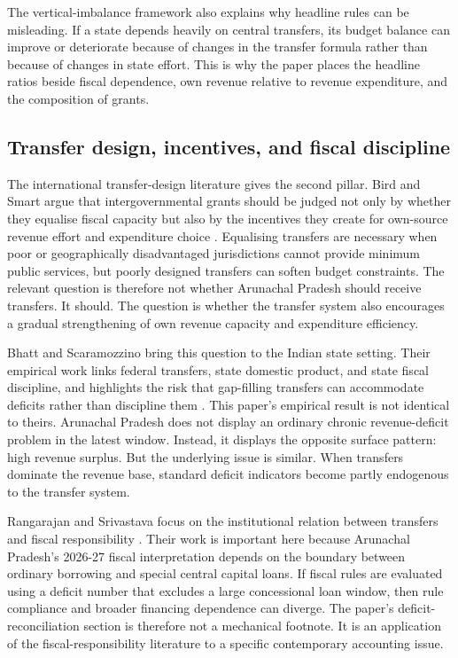 \documentclass[11pt,a4paper]{article}
\begin{document}
The vertical-imbalance framework also explains why headline rules can be misleading. If a state depends heavily on central transfers, its budget balance can improve or deteriorate because of changes in the transfer formula rather than because of changes in state effort. This is why the paper places the headline ratios beside fiscal dependence, own revenue relative to revenue expenditure, and the composition of grants.

\subsection{Transfer design, incentives, and fiscal discipline}

The international transfer-design literature gives the second pillar. Bird and Smart argue that intergovernmental grants should be judged not only by whether they equalise fiscal capacity but also by the incentives they create for own-source revenue effort and expenditure choice \cite{bird_smart_2002}. Equalising transfers are necessary when poor or geographically disadvantaged jurisdictions cannot provide minimum public services, but poorly designed transfers can soften budget constraints. The relevant question is therefore not whether Arunachal Pradesh should receive transfers. It should. The question is whether the transfer system also encourages a gradual strengthening of own revenue capacity and expenditure efficiency.

Bhatt and Scaramozzino bring this question to the Indian state setting. Their empirical work links federal transfers, state domestic product, and state fiscal discipline, and highlights the risk that gap-filling transfers can accommodate deficits rather than discipline them \cite{bhatt_scaramozzino_2015}. This paper's empirical result is not identical to theirs. Arunachal Pradesh does not display an ordinary chronic revenue-deficit problem in the latest window. Instead, it displays the opposite surface pattern: high revenue surplus. But the underlying issue is similar. When transfers dominate the revenue base, standard deficit indicators become partly endogenous to the transfer system.

Rangarajan and Srivastava focus on the institutional relation between transfers and fiscal responsibility \cite{rangarajan_srivastava_2011}. Their work is important here because Arunachal Pradesh's 2026-27 fiscal interpretation depends on the boundary between ordinary borrowing and special central capital loans. If fiscal rules are evaluated using a deficit number that excludes a large concessional loan window, then rule compliance and broader financing dependence can diverge. The paper's deficit-reconciliation section is therefore not a mechanical footnote. It is an application of the fiscal-responsibility literature to a specific contemporary accounting issue.
\end{document}
